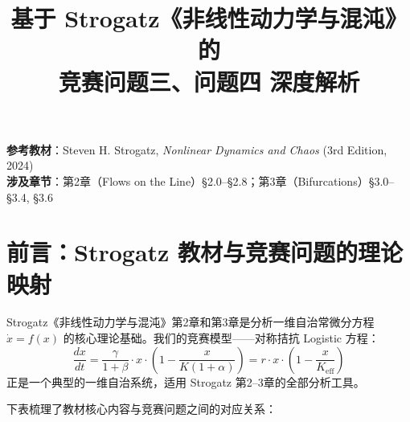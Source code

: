 \documentclass[12pt,a4paper]{article}
\title{\textbf{基于 Strogatz《非线性动力学与混沌》的\\[4pt] 竞赛问题三、问题四 深度解析}}
\author{}
\date{}
\begin{document}
\maketitle

\begin{center}
\small
\textbf{参考教材}：Steven H. Strogatz, \textit{Nonlinear Dynamics and Chaos} (3rd Edition, 2024)\\[4pt]
\textbf{涉及章节}：第2章（Flows on the Line）\S2.0--\S2.8；第3章（Bifurcations）\S3.0--\S3.4, \S3.6
\end{center}

\vspace{12pt}

\section{前言：Strogatz 教材与竞赛问题的理论映射}

Strogatz《非线性动力学与混沌》第2章和第3章是分析一维自治常微分方程
$\dot{x} = f(x)$ 的核心理论基础。我们的竞赛模型——对称拮抗 Logistic 方程：
\begin{equation}\label{eq:model}
\frac{dx}{dt} = \frac{\gamma}{1+\beta} \cdot x \cdot \left(1 - \frac{x}{K(1+\alpha)}\right)
= r \cdot x \cdot \left(1 - \frac{x}{K_{\text{eff}}}\right)
\end{equation}
正是一个典型的一维自治系统，适用 Strogatz 第2--3章的全部分析工具。

下表梳理了教材核心内容与竞赛问题之间的对应关系：
\end{document}
